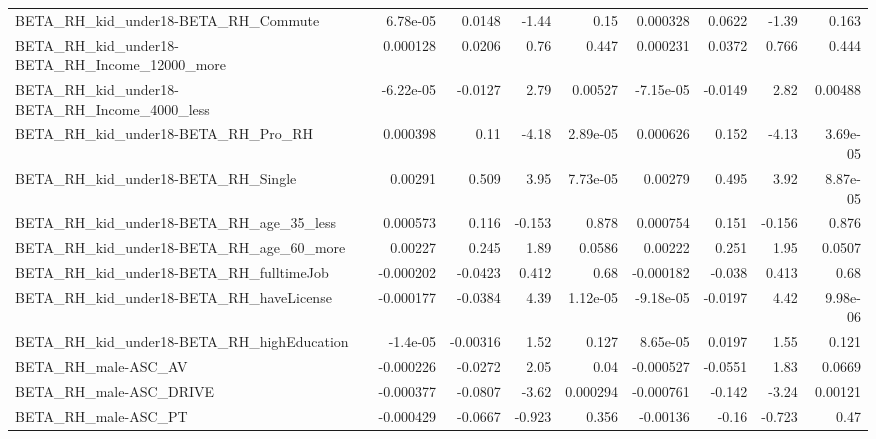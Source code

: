 \begin{tabular}{lrrrrrrrr}
BETA\_RH\_kid\_under18-BETA\_RH\_Commute                &    6.78e-05 &       0.0148 &     -1.44 &     0.15 &   0.000328 &      0.0622 &        -1.39 &         0.163 \\
BETA\_RH\_kid\_under18-BETA\_RH\_Income\_12000\_more      &    0.000128 &       0.0206 &      0.76 &    0.447 &   0.000231 &      0.0372 &        0.766 &         0.444 \\
BETA\_RH\_kid\_under18-BETA\_RH\_Income\_4000\_less       &   -6.22e-05 &      -0.0127 &      2.79 &  0.00527 &  -7.15e-05 &     -0.0149 &         2.82 &       0.00488 \\
BETA\_RH\_kid\_under18-BETA\_RH\_Pro\_RH                 &    0.000398 &         0.11 &     -4.18 & 2.89e-05 &   0.000626 &       0.152 &        -4.13 &      3.69e-05 \\
BETA\_RH\_kid\_under18-BETA\_RH\_Single                 &     0.00291 &        0.509 &      3.95 & 7.73e-05 &    0.00279 &       0.495 &         3.92 &      8.87e-05 \\
BETA\_RH\_kid\_under18-BETA\_RH\_age\_35\_less            &    0.000573 &        0.116 &    -0.153 &    0.878 &   0.000754 &       0.151 &       -0.156 &         0.876 \\
BETA\_RH\_kid\_under18-BETA\_RH\_age\_60\_more            &     0.00227 &        0.245 &      1.89 &   0.0586 &    0.00222 &       0.251 &         1.95 &        0.0507 \\
BETA\_RH\_kid\_under18-BETA\_RH\_fulltimeJob            &   -0.000202 &      -0.0423 &     0.412 &     0.68 &  -0.000182 &      -0.038 &        0.413 &          0.68 \\
BETA\_RH\_kid\_under18-BETA\_RH\_haveLicense            &   -0.000177 &      -0.0384 &      4.39 & 1.12e-05 &  -9.18e-05 &     -0.0197 &         4.42 &      9.98e-06 \\
BETA\_RH\_kid\_under18-BETA\_RH\_highEducation          &    -1.4e-05 &     -0.00316 &      1.52 &    0.127 &   8.65e-05 &      0.0197 &         1.55 &         0.121 \\
BETA\_RH\_male-ASC\_AV                                &   -0.000226 &      -0.0272 &      2.05 &     0.04 &  -0.000527 &     -0.0551 &         1.83 &        0.0669 \\
BETA\_RH\_male-ASC\_DRIVE                             &   -0.000377 &      -0.0807 &     -3.62 & 0.000294 &  -0.000761 &      -0.142 &        -3.24 &       0.00121 \\
BETA\_RH\_male-ASC\_PT                                &   -0.000429 &      -0.0667 &    -0.923 &    0.356 &   -0.00136 &       -0.16 &       -0.723 &          0.47 \\

\end{tabular}
